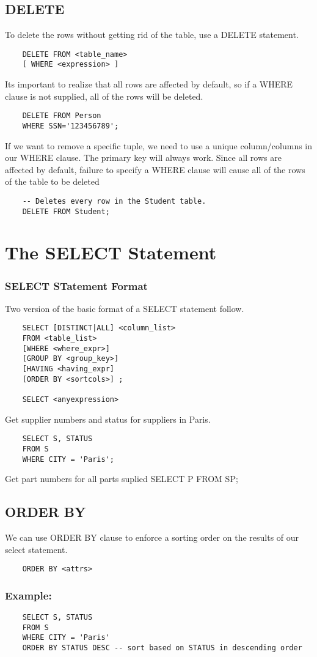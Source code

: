 \documentclass{report}
\begin{document}
    \subsection{DELETE}
    To delete the rows without getting rid of the table, use a DELETE statement.
    \begin{verbatim}
    DELETE FROM <table_name> 
    [ WHERE <expression> ]
    \end{verbatim}
    Its important to realize that all rows are affected by default, so if a WHERE clause is not supplied, all of the rows will be deleted.
    \begin{verbatim}
    DELETE FROM Person 
    WHERE SSN='123456789';
    \end{verbatim}
    If we want to remove a specific tuple, we need to use a unique column/columns in our WHERE clause. The primary key will always work.
    \bigbreak \noindent
    Since all rows are affected by default, failure to specify a WHERE clause will cause all of the rows of the table to be deleted
    \begin{verbatim}
    -- Deletes every row in the Student table.
    DELETE FROM Student;
    \end{verbatim}
    \section{The SELECT Statement}
    \subsubsection{SELECT STatement Format}
    Two version of the basic format of a SELECT statement follow.
    \begin{verbatim}
    SELECT [DISTINCT|ALL] <column_list>
    FROM <table_list>
    [WHERE <where_expr>]
    [GROUP BY <group_key>]
    [HAVING <having_expr]
    [ORDER BY <sortcols>] ;

    SELECT <anyexpression>
    \end{verbatim}
    Get supplier numbers and status for suppliers in Paris.
\begin{verbatim}
    SELECT S, STATUS    
    FROM S
    WHERE CITY = 'Paris';
    \end{verbatim}
    Get part numbers for all parts suplied
    SELECT P FROM SP;
    \subsection{ORDER BY}
    We can use ORDER BY clause to enforce a sorting order on the results of our select statement.
    \begin{verbatim}
    ORDER BY <attrs>
    \end{verbatim}
    \subsubsection*{Example:}
    \begin{verbatim}
    SELECT S, STATUS 
    FROM S
    WHERE CITY = 'Paris'
    ORDER BY STATUS DESC -- sort based on STATUS in descending order
    \end{verbatim}
\end{document}
